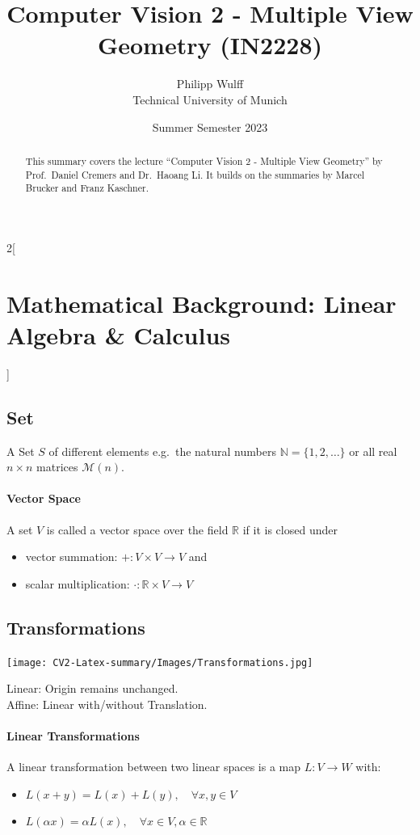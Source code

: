 \documentclass[oneside,fontsize=11pt,paper=a4]{scrartcl}
\title{Computer Vision 2 - Multiple View Geometry (IN2228)}
\author{Philipp Wulff \\ Technical University of Munich \\}
\date{Summer Semester 2023}
\begin{document}
\maketitle

\begin{abstract}
\noindent This summary covers the lecture ``Computer Vision 2 - Multiple View Geometry''  by Prof.\ Daniel Cremers and  Dr.\ Haoang Li. It builds on the summaries by Marcel Brucker and Franz Kaschner. 
\end{abstract}



\begin{multicols}{2}[\section{Mathematical Background: Linear Algebra \& Calculus}]
\subsection{Set}
A Set $S$ of different elements e.g.\ the natural numbers $\mathbb{N} = \{1, 2, \dots\}$ or all real $n \times n$ matrices $\mathcal{M}(n)$.

\paragraph{Vector Space} A set $V$ is called a vector space over the field $\mathbb{R}$ if it is closed under
\begin{itemize}
    \setlength\itemsep{-0.2em}
    \item vector summation: $+: V \times V \rightarrow V$  and 
    \item scalar multiplication: $\cdot: \mathbb{R} \times V \rightarrow V$
\end{itemize}

\subsection{Transformations}
\begin{center}
    \texttt{[image: CV2-Latex-summary/Images/Transformations.jpg]}
\end{center}
Linear: Origin remains unchanged.\\
Affine: Linear with/without Translation.

\paragraph{Linear Transformations} A linear transformation between two linear spaces is a map $L: V \rightarrow W$ with:
\begin{itemize}
    \setlength\itemsep{-0.2em}
    \item $L(x+y)=L(x)+L(y), \quad\forall x,y \in V$
    \item $L(\alpha x) = \alpha L(x), \quad\forall x \in V, \alpha \in \mathbb{R} $
\end{itemize}


\end{multicols}
\end{document}
